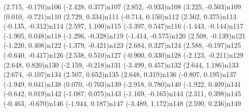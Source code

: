 \dotnode[dotstyle=Bo](2.715, -0.170){n106}
\dotnode[dotstyle=Btriangle](-2.428, 0.377){n107}
\dotnode[dotstyle=Bo](2.852, -0.933){n108}
\dotnode[dotstyle=Bo](3.225, -0.503){n109}
\dotnode[dotstyle=Btriangle](0.010, -0.721){n110}
\dotnode[dotstyle=Bsquare](2.729, 0.334){n111}
\dotnode[dotstyle=Btriangle](-0.714, 0.150){n112}
\dotnode[dotstyle=Bsquare](2.562, 0.375){n113}
\dotnode[dotstyle=Btriangle](-0.135, -0.312){n114}
\dotnode[dotstyle=Bsquare](2.597, 1.100){n115}
\dotnode[dotstyle=Btriangle](-3.397, 0.547){n116}
\dotnode[dotstyle=Btriangle](-1.443, -0.144){n117}
\dotnode[dotstyle=Btriangle](-1.905, 0.048){n118}
\dotnode[dotstyle=Btriangle](-1.296, -0.328){n119}
\dotnode[dotstyle=Btriangle](-1.414, -0.575){n120}
\dotnode[dotstyle=Bo](2.508, -0.139){n121}
\dotnode[dotstyle=Btriangle](-1.220, 0.408){n122}
\dotnode[dotstyle=Btriangle](-1.379, -0.421){n123}
\dotnode[dotstyle=Bsquare](2.684, 0.327){n124}
\dotnode[dotstyle=Bo](2.588, -0.197){n125}
\dotnode[dotstyle=Btriangle](-0.640, -0.417){n126}
\dotnode[dotstyle=Bsquare](2.538, 0.510){n127}
\dotnode[dotstyle=Btriangle](-0.900, 0.330){n128}
\dotnode[dotstyle=Btriangle](-2.123, -0.211){n129}
\dotnode[dotstyle=Bsquare](2.648, 0.820){n130}
\dotnode[dotstyle=Btriangle](-2.159, -0.218){n131}
\dotnode[dotstyle=Btriangle](-3.499, 0.457){n132}
\dotnode[dotstyle=Bsquare](2.644, 1.186){n133}
\dotnode[dotstyle=Bo](2.674, -0.107){n134}
\dotnode[dotstyle=Bsquare](2.507, 0.652){n135}
\dotnode[dotstyle=Bsquare](2.648, 0.319){n136}
\dotnode[dotstyle=Btriangle](-0.807, 0.195){n137}
\dotnode[dotstyle=Btriangle](-1.949, 0.041){n138}
\dotnode[dotstyle=Btriangle](0.070, -0.703){n139}
\dotnode[dotstyle=Btriangle](-2.918, 0.780){n140}
\dotnode[dotstyle=Btriangle](-1.922, 0.409){n141}
\dotnode[dotstyle=Btriangle](-0.642, 0.019){n142}
\dotnode[dotstyle=Btriangle](-1.087, 0.075){n143}
\dotnode[dotstyle=Btriangle](-1.169, -0.165){n144}
\dotnode[dotstyle=Bsquare](2.311, 0.398){n145}
\dotnode[dotstyle=Btriangle](-0.463, -0.670){n146}
\dotnode[dotstyle=Btriangle](-1.944, 0.187){n147}
\dotnode[dotstyle=Btriangle](-3.489, 1.172){n148}
\dotnode[dotstyle=Bsquare](2.590, 0.236){n149}
